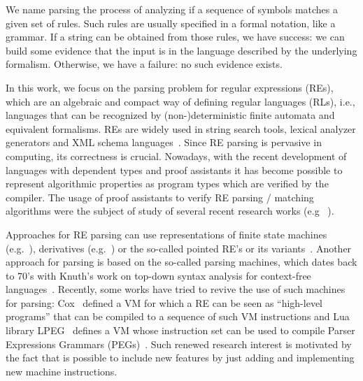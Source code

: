 \documentclass[review]{elsarticle}
\theoremstyle{definition}
\begin{document}
We name parsing the process of analyzing if a sequence of symbols matches a given set of rules.
Such rules are usually specified in a formal notation, like a grammar. If a string can be obtained
from those rules, we have success: we can build some evidence that the input is in the language
described by the underlying formalism. Otherwise, we have a failure: no such evidence exists.

In this work, we focus on the parsing problem for regular expressions (REs), which are an algebraic
and compact way of defining regular languages (RLs), i.e., languages that can be recognized by
(non-)deterministic finite automata and equivalent formalisms. REs are widely used in string search
tools, lexical analyzer generators and XML schema languages~\cite{Frisch2004}. Since RE parsing
is pervasive in computing, its correctness is crucial. Nowadays, with the recent
development of languages with dependent types and proof assistants it has become
possible to represent algorithmic properties as program types which are verified
by the compiler. The usage of proof assistants to verify RE parsing / matching algorithms
were the subject of study of several recent research works (e.g ~\cite{Firsov13,Ribeiro2017,Lopes2016,Asperti10}).

Approaches for RE parsing can use representations of finite state machines (e.g.~\cite{Firsov13}),
derivatives (e.g.~\cite{Ribeiro2017,Lopes2018,Lopes2016}) or the so-called pointed RE's or its
variants~\cite{Asperti10,Fischer2010}. Another approach for parsing is based on the so-called
parsing machines, which dates back to 70's with Knuth's work
on top-down syntax analysis for context-free languages~\cite{Knuth71}. Recently, some works
have tried to revive the use of such machines for parsing: Cox~\cite{Cox2009} defined a VM
for which a RE can be seen as ``high-level programs'' that can be compiled to a sequence of
such VM instructions and Lua library LPEG~\cite{Ierusalimschy2009} defines a VM whose instruction
set can be used to compile Parser Expressions Grammars (PEGs)~\cite{Ford04}. Such renewed research
interest is motivated by the fact that is possible to include new features by just adding and
implementing new machine instructions.
\end{document}

